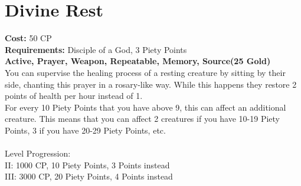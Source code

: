 \section{Divine Rest}
\textbf{Cost:} 50 CP\\
\textbf{Requirements:} Disciple of a God, 3 Piety Points \\
\textbf{Active, Prayer, Weapon, Repeatable, Memory, Source(25 Gold)}\\
You can supervise the healing process of a resting creature by sitting by their side, chanting this prayer in a rosary-like way. While this happens they restore 2 points of health per hour instead of 1.\\
For every 10 Piety Points that you have above 9, this can affect an additional creature. This means that you can affect 2 creatures if you have 10-19 Piety Points, 3 if you have 20-29 Piety Points, etc.\\
\\
Level Progression:\\
II: 1000 CP, 10 Piety Points, 3 Points instead\\
III: 3000 CP, 20 Piety Points, 4 Points instead\\